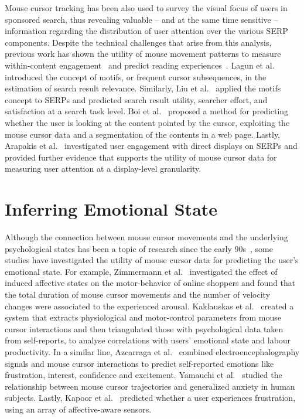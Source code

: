 \documentclass[11pt,oneside,a4paper,openright]{book}
\begin{document}
Mouse cursor tracking has been also used to survey the visual focus of users in sponsored search,
thus revealing valuable -- and at the same time sensitive -- information
regarding the distribution of user attention over the various SERP components.
Despite the technical challenges that arise from this analysis,
previous work has shown the utility of mouse movement patterns
to measure within-content engagement~\cite{Arapakis14_news}
and predict reading experiences~\cite{Arapakis14_gestures, Hauger11}.
Lagun et al.~\cite{Lagun14_motifs} introduced the concept of motifs,
or frequent cursor subsequences, in the estimation of search result relevance.
Similarly, Liu et al.~\cite{Liu15_opinions} applied the motifs concept to SERPs
and predicted search result utility, searcher effort, and satisfaction at a search task level.
Boi et al.~\cite{Boi2016} proposed a method for predicting whether the user is looking at the content pointed by the cursor,
exploiting the mouse cursor data and a segmentation of the contents in a web page.
Lastly, Arapakis et al.~\cite{Arapakis16_dds, Arapakis20_ppa}
investigated user engagement with direct displays on SERPs
and provided further evidence that supports the utility of mouse cursor data
for measuring user attention at a display-level granularity.

\section{Inferring Emotional State}
\label{sec:emotion}

Although the connection between mouse cursor movements and the underlying psychological states has been a topic of research
since the early 90s~\cite{Accot97_fitts, Card87_mouse},
some studies have investigated the utility of mouse cursor data for predicting the user's emotional state.
For example, Zimmermann et al.~\cite{Zimmermann2003} investigated the effect of induced affective states
on the motor-behavior of online shoppers and found that the total duration of mouse cursor movements
and the number of velocity changes were associated to the experienced arousal.
Kaklauskas et al.~\cite{Kaklauskas2009}
created a system that extracts physiological and motor-control parameters
from mouse cursor interactions and then triangulated those with psychological data taken from self-reports,
to analyse correlations with users' emotional state and labour productivity.
In a similar line, Azcarraga et al.~\cite{Azcarraga12_brain} combined electroencephalography signals and mouse cursor interactions
to predict self-reported emotions like frustration, interest, confidence and excitement.
Yamauchi et al.~\cite{Yamauchi13_anxiety} studied the relationship between mouse cursor trajectories and generalized anxiety in human subjects.
Lastly, Kapoor et al.~\cite{Kapoor07_frustration} predicted whether a user experiences frustration, using an array of affective-aware sensors.
\end{document}
